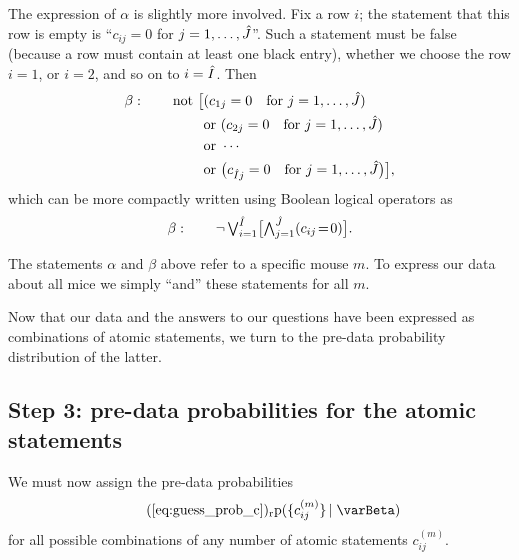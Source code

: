 \documentclass[\ifafour a4paper,12pt,\else a5paper,10pt,\fi%
onecolumn,oneside,article,%
british%
]{memoir}
\theoremstyle{remark}
\theoremstyle{innote}
\newcommand*{\pf}{\mathrm{p}}%
\renewcommand*{\|}[1][]{\nonscript\,#1\vert\nonscript\;\mathopen{}}
\newcommand*{\labelbis}[1]{\tag*{(\ref{#1})$_\text{r}$}}
\newcommand*{\tland}{\mathop{\textstyle\bigwedge}\nolimits}
\newcommand*{\tlor}{\mathop{\textstyle\bigvee}\nolimits}
\newcommand*{\yI}{\varBeta}
\newcommand*{\eq}{\mathrel{\!=\!}}
\newcommand*{\ycm}[1][m]{c^{(#1)}}
\DeclarePairedDelimiter\tu{\{}{\}}
\newcommand*{\yIh}{\Hat{I}}
\newcommand*{\yJh}{\Hat{J}}
\newcommand*{\ka}{\alpha}
\newcommand*{\kb}{\beta}
\begin{document}
The expression of $\ka$ is slightly more involved. Fix a row $i$; the
statement that this row is empty is \enquote{$c_{ij}=0$ for
  $j=1, \dotsc, \yJh$}. Such a statement must be false (because a row must
contain at least one black entry), whether we choose the row $i=1$, or
$i=2$, and so on to $i=\yIh$. Then
\begin{equation}
  \label{eq:alpha_and}
  \begin{aligned}
  \kb:\qquad \text{not }\bigl[ &(c_{1j} =0 \quad\text{for }j=1,\dotsc,\yJh)
\\  &\text{or }
  (c_{2j} =0 \quad\text{for }j=1,\dotsc,\yJh)
    \\  &\text{or } \dotsb
    \\&\text{or }
  \bigl(c_{\yIh j} =0 \quad\text{for }j=1,\dotsc,\yJh \bigr)\bigr],
  \end{aligned}
\end{equation}
which can be more compactly written using Boolean logical operators as
\begin{equation}
  \label{eq:alpha_and_boole}
    \kb:\qquad \lnot \tlor_{i=1}^{\yIh} \bigl[
\tland_{j=1}^{\yJh} (c_{ij} \eq 0)
    \bigr].
\end{equation}

\medskip

The statements $\ka$ and $\kb$ above refer to a specific mouse $m$. To
express our data about all mice we simply \enquote{and} these statements
for all $m$.

Now that our data and the answers to our questions have been expressed as
combinations of atomic statements, we turn to the pre-data probability
distribution of the latter.


\subsection{Step 3: pre-data probabilities for the atomic statements}
\label{sec:step_joint_prob}

We must now assign the pre-data probabilities
\begin{equation}
  \labelbis{eq:guess_prob_c}
  \pf(\tu{\ycm_{ij}} \| \yI)
\end{equation}
for all possible combinations of any number of atomic statements
$\ycm_{ij}$.
\end{document}
